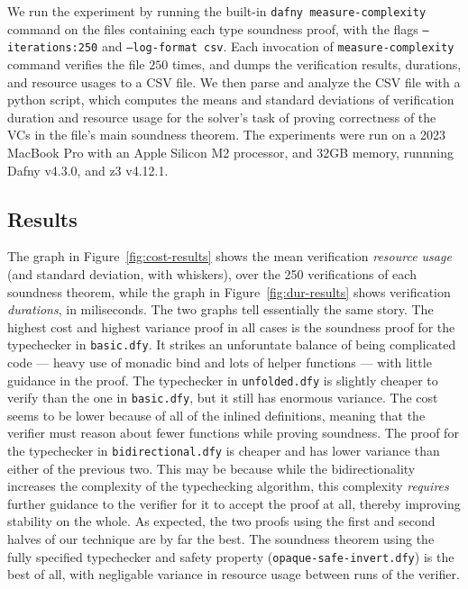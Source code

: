 \documentclass[sigplan,review,screen,anonymous]{acmart}
\begin{document}
We run the experiment by running the built-in \texttt{dafny measure-complexity}
command on the files containing each type soundness proof, with the flags \texttt{--iterations:250} and \texttt{--log-format csv}.
Each invocation of \texttt{measure-complexity} command verifies the file $250$ times, and dumps
the verification results, durations, and resource usages to a CSV file. We then parse and analyze the CSV
file with a python script, which computes the means and standard deviations of verification duration and resource usage for the solver's task of proving correctness
of the VCs in the file's main soundness theorem.
The experiments were run on a 2023 MacBook Pro with an Apple Silicon M2 processor, and 32GB memory, runnning Dafny v4.3.0, and z3 v4.12.1.

\subsection*{Results}
The graph in Figure~\ref{fig:cost-results} shows the mean verification \emph{resource usage} (and standard deviation, with whiskers), over the 250 verifications of each soundness theorem,
while the graph in Figure~\ref{fig:dur-results} shows verification \emph{durations}, in miliseconds. The two graphs tell essentially the same story.
The highest cost and highest variance proof in all cases is the soundness proof for the typechecker in \texttt{basic.dfy}. It strikes an unforuntate balance of being complicated code --- heavy use of monadic bind and lots of helper functions --- with little guidance in the proof.
The typechecker in \texttt{unfolded.dfy} is slightly cheaper to verify than the one in \texttt{basic.dfy}, but it still has enormous variance. The cost seems to be lower because of all of the inlined definitions,
meaning that the verifier must reason about fewer functions while proving soundness.
The proof for the typechecker in \texttt{bidirectional.dfy} is cheaper and has lower variance than either of the previous two. This may be because while the bidirectionality increases the complexity of the typechecking algorithm,
this complexity \emph{requires} further guidance to the verifier for it to accept the proof at all, thereby improving stability on the whole.
As expected, the two proofs using the first and second halves of our technique
are by far the best. The soundness theorem using the fully specified typechecker and safety property (\texttt{opaque-safe-invert.dfy})
is the best of all, with negligable variance in resource usage between runs of the verifier.
\end{document}
